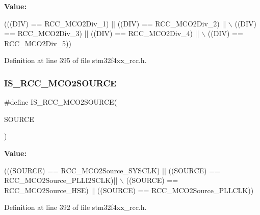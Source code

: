 {\bfseries Value\+:}
\begin{DoxyCode}
(((DIV) == RCC\_MCO2Div\_1) || ((DIV) == RCC\_MCO2Div\_2) || \(\backslash\)
                             ((DIV) == RCC\_MCO2Div\_3) || ((DIV) == RCC\_MCO2Div\_4) || \(\backslash\)
                             ((DIV) == RCC\_MCO2Div\_5))
\end{DoxyCode}


Definition at line 395 of file stm32f4xx\+\_\+rcc.\+h.

\mbox{\label{group___r_c_c___m_c_o2___clock___source___prescaler_ga99f4a9acbacb5e4d2b27bb9f4f2c0a2f}} 
\subsubsection{\texorpdfstring{I\+S\+\_\+\+R\+C\+C\+\_\+\+M\+C\+O2\+S\+O\+U\+R\+CE}{IS\_RCC\_MCO2SOURCE}}
{\footnotesize\ttfamily \#define I\+S\+\_\+\+R\+C\+C\+\_\+\+M\+C\+O2\+S\+O\+U\+R\+CE(\begin{DoxyParamCaption}\item[{}]{S\+O\+U\+R\+CE }\end{DoxyParamCaption})}

{\bfseries Value\+:}
\begin{DoxyCode}
(((SOURCE) == RCC\_MCO2Source\_SYSCLK) || ((SOURCE) == RCC\_MCO2Source\_PLLI2SCLK)|| \(\backslash\)
                                   ((SOURCE) == RCC\_MCO2Source\_HSE) || ((SOURCE) == RCC\_MCO2Source\_PLLCLK))
\end{DoxyCode}


Definition at line 392 of file stm32f4xx\+\_\+rcc.\+h.

